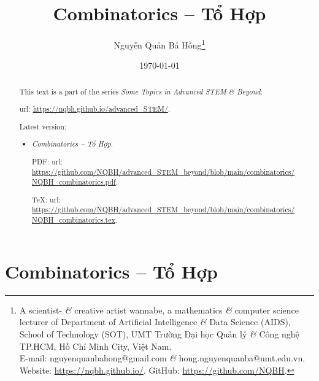 \documentclass{article}
\title{Combinatorics -- Tổ Hợp}
\author{Nguyễn Quản Bá Hồng\footnote{A scientist- {\it\&} creative artist wannabe, a mathematics {\it\&} computer science lecturer of Department of Artificial Intelligence {\it\&} Data Science (AIDS), School of Technology (SOT), UMT Trường Đại học Quản lý {\it\&} Công nghệ TP.HCM, Hồ Chí Minh City, Việt Nam.\\E-mail: {\sf nguyenquanbahong@gmail.com} {\it\&} {\sf hong.nguyenquanba@umt.edu.vn}. Website: \url{https://nqbh.github.io/}. GitHub: \url{https://github.com/NQBH}.}}
\date{\today}
\begin{document}
\maketitle
\begin{abstract}
	This text is a part of the series {\it Some Topics in Advanced STEM \& Beyond}:
	
	{\sc url}: \url{https://nqbh.github.io/advanced_STEM/}.
	
	Latest version:
	\begin{itemize}
		\item {\it Combinatorics -- Tổ Hợp}.
		
		PDF: {\sc url}: \url{https://github.com/NQBH/advanced_STEM_beyond/blob/main/combinatorics/NQBH_combinatorics.pdf}.
		
		\TeX: {\sc url}: \url{https://github.com/NQBH/advanced_STEM_beyond/blob/main/combinatorics/NQBH_combinatorics.tex}.
	\end{itemize}
\end{abstract}
\tableofcontents


\section{Combinatorics -- Tổ Hợp}
\end{document}
